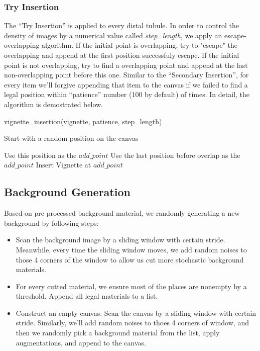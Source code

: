 \documentclass{article}
\begin{document}
\subsubsection{Try Insertion}
The ``Try Insertion'' is applied to every distal tubule. In order to control the density of images by a numerical value called \textit{step\_length}, we apply an escape-overlapping algorithm. If the initial point is overlapping, try to "escape" the overlapping and append at the first position successfuly escape. If the initial point is not overlapping, try to find a overlapping point and append at the last non-overlapping point before this one. Similar to the ``Secondary Insertion'', for every item we'll forgive appending that item to the canvas if we failed to find a legal position within ``patience'' number (100 by default) of times. In detail, the algorithm is demostrated below. 
\begin{algorithm}[ht]
	\label{algo: collage_generator_insertion}
	\SetAlgoLined
	\caption{vignette\_insertion(vignette, patience, step\_length)}
	Start with a random position on the canvas\;
	
	{{
			Use this position as the $add\_point$\;}}
	{{
			Use the last position before overlap as the $add\_point$\;}}
	Insert Vignette at $add\_point$\;
\end{algorithm} 

\subsection{Background Generation}
Based on pre-processed background material, we randomly generating a new background by following steps:
\begin{itemize}
	\item Scan the background image by a sliding window with certain stride. Meanwhile, every time the sliding window moves, we add random noises to those 4 corners of the window to allow us cut more stochastic background materials.
	\item For every cutted material, we ensure most of the places are nonempty by a threshold. Append all legal materials to a list.
	\item Construct an empty canvas. Scan the canvas by a sliding window with certain stride. Similarly, we'll add random noises to thoes 4 corners of window, and then we randomly pick a background material from the list, apply augmentations, and append to the canvas.
\end{itemize}
\end{document}
